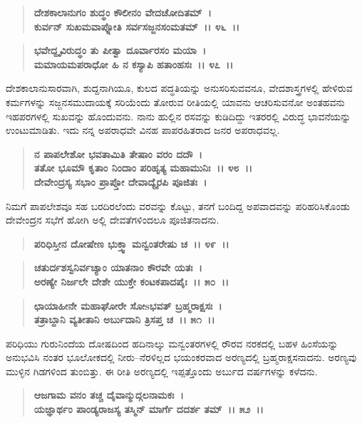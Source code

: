\begin{verse}
\textbf{ದೇಶಕಾಲಾನುಗಂ ಶುದ್ಧಂ ಕೌಲೀನಂ ವೇದಚೋದಿತಮ್~।}\\\textbf{ಕುರ್ವನ್ ಸುಖಮವಾಪ್ನೋತಿ ಸರ್ವಸಜ್ಜನಸಂಮತಮ್~।। ೪೬~।। }
\end{verse}

\begin{verse}
\textbf{ಭವೇದ್ದೃವಿರುದ್ಧಂ ತು ಪೀತ್ವಾ ದೂರ್ವಾರಸಂ ಮಯಾ~।}\\\textbf{ಮಮಾಯಮಪರಾಧೋ ಹಿ ನ ಕಸ್ಯಾಪಿ ಹತಾಂಹಸಃ~।। ೪೭~।।}
\end{verse}

ದೇಶಕಾಲಾನುಸಾರವಾಗಿ, ಶುದ್ದನಾಗಿಯೂ, ಕುಲದ ಪದ್ಧತಿಯನ್ನು ಅನುಸರಿಸುವವನೂ, ವೇದಶಾಸ್ತ್ರಗಳಲ್ಲಿ ಹೇಳಿರುವ ಕರ್ಮಗಳನ್ನು ಸಜ್ಜನಸಮುದಾಯಕ್ಕೆ ಸರಿಯೆಂದು ತೋರುವ ರೀತಿಯಲ್ಲಿ ಯಾವನು ಆಚರಿಸುವನೋ ಅಂತಹವನು ಇಹಪರಗಳಲ್ಲಿ ಸುಖವನ್ನು ಹೊಂದುವನು. ನಾನು ಹುಲ್ಲಿನ ರಸವನ್ನು ಕುಡಿದಿದ್ದು ಇತರರಲ್ಲಿ ವಿರುದ್ಧ ಭಾವನೆಯನ್ನು ಉಂಟುಮಾಡಿತು. ಇದು ನನ್ನ ಅಪರಾಧವೇ ವಿನಹ ಪಾಪರಹಿತರಾದ ಜನರ ಅಪರಾಧವಲ್ಲ.

\begin{verse}
\textbf{ನ ಪಾಪಲೇಶೋ ಭವತಾಮಿತಿ ತೇಷಾಂ ವರಂ ದದೌ~।}\\\textbf{ತತೋ ಭೂಮೌ ಕೃತಾಂ ನಿಂದಾಂ ಪರಿಹೃತ್ಯ ಮಹಾಮುನಿಃ~।। ೪೮~।।}\\\textbf{ದೇವೇಂದ್ರಸ್ಯ ಸಭಾಂ ಪ್ರಾಪ್ತೋ ದೇವಾದ್ಯೈರಪಿ ಪೂಜಿತಃ~।}
\end{verse}

ನಿಮಗೆ ಪಾಪಲೇಶವೂ ಸಹ ಬರದಿರಲೆಂದು ವರವನ್ನು ಕೊಟ್ಟು, ತನಗೆ ಬಂದಿದ್ದ ಅಪವಾದವನ್ನು ಪರಿಹರಿಸಿಕೊಂಡು ದೇವೇಂದ್ರನ ಸಭೆಗೆ ಹೋಗಿ ಅಲ್ಲಿ ದೇವತೆಗಳಿಂದಲೂ ಪೂಜಿತನಾದನು.

\begin{verse}
\textbf{ಪರಿಧಿಸ್ತೀನ ದೋಷೇಣ ಭುಕ್ತ್ವಾ ಮನ್ವಂತರೇಷು ಚ~।। ೪೯~।।}
\end{verse}

\begin{verse}
\textbf{ಚತುರ್ದಶಸ್ವನಿರ್ವಚ್ಯಾಂ ಯಾತನಾಂ ಕೌರವೇ ಯತಃ~।}\\\textbf{ಅರಣ್ಯೇ ನಿರ್ಜಲೇ ದೇಶೇ ಯುಕ್ತೇ ಕಂಟಕಪಾದಪೈಃ~।। ೫೦~।।}
\end{verse}

\begin{verse}
\textbf{ಛಾಯಾಹೀನೇ ಮಹಾಘೋರೇ ಸೋsಭವತ್ ಬ್ರಹ್ಮರಾಕ್ಷಸಃ~।}\\\textbf{ತತ್ರಾಬ್ದಾನಿ ವ್ಯತೀತಾನಿ ಅರ್ಬುದಾನಿ ತ್ರಿಸಪ್ತ ಚ~।। ೫೧~।।}
\end{verse}

ಪರಿಧಿಯು ಗುರುನಿಂದೆಯ ದೋಷದಿಂದ ಹದಿನಾಲ್ಕು ಮನ್ವಂತರಗಳಲ್ಲಿ ರೌರವ ನರಕದಲ್ಲಿ ಬಹಳ ಹಿಂಸೆಯನ್ನು ಅನುಭವಿಸಿ ನಂತರ ಭೂಲೋಕದಲ್ಲಿ ನೀರು–ನೆರಳಿಲ್ಲದ ಭಯಂಕರವಾದ ಅರಣ್ಯದಲ್ಲಿ ಬ್ರಹ್ಮರಾಕ್ಷಸನಾದನು. ಅರಣ್ಯವು ಮುಳ್ಳಿನ ಗಿಡಗಳಿಂದ ತುಂಬಿತ್ತು. ಈ ರೀತಿ ಅರಣ್ಯದಲ್ಲಿ ಇಪ್ಪತ್ತೊಂದು ಅರ್ಬುದ ವರ್ಷಗಳನ್ನು ಕಳೆದನು.

\begin{verse}
\textbf{ಆಜಗಾಮ ವನಂ ತಚ್ಚ ದೈವಾನ್ಮುದ್ಗಲನಾಮಕಃ~।}\\\textbf{ಯಜ್ಞಾರ್ಥಂ ಪಾಂಡ್ಯರಾಜಸ್ಯ ತಸ್ಮಿನ್ ಮಾರ್ಗೆ ದದರ್ಶ ತಮ್~।। ೫೨~।। }
\end{verse}

